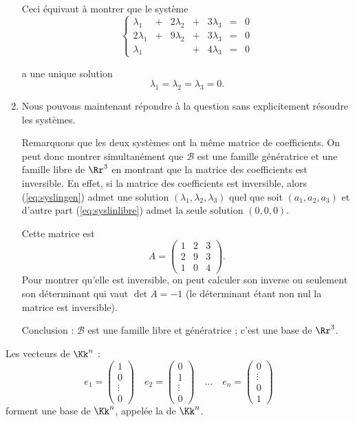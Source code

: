 \documentclass[class=report,crop=false]{standalone}
\begin{document}
\begin{exemple}
\begin{enumerate}
Ceci équivaut à montrer que le  système
\begin{equation}
\left\{
\begin{array}{ccccccc}
\lambda_1 &+ &2\lambda_2 &+ &3\lambda_3 & = & 0\\
2\lambda_1 &+ &9\lambda_2 &+ &3\lambda_3 & = & 0\\
\lambda_1 && &+ &4\lambda_3 & = & 0
\end{array}
\right.
\label{eq:syslinlibre}
\tag{S'}
\end{equation}



a une  unique solution
$$ \lambda_1 = \lambda_2 = \lambda_3 = 0.$$

  \item Nous pouvons maintenant répondre à la question sans explicitement résoudre les systèmes.

  Remarquons que les deux systèmes ont la même matrice de coefficients.
  On peut donc montrer simultanément que $\mathcal{B}$ est une famille génératrice
  et une famille libre de $\Rr^3$ en montrant que la matrice des
  coefficients est inversible.
  En effet, si la matrice des coefficients est inversible, alors (\ref{eq:syslingen})
  admet une solution $(\lambda_1,\lambda_2,\lambda_3)$ quel que soit $(a_1,a_2,a_3)$
  et d'autre part (\ref{eq:syslinlibre})
  admet la seule solution $(0,0,0)$.

  Cette matrice est
$$
A = \begin{pmatrix}
1 & 2 & 3\\
2 & 9 & 3\\
1 &0 & 4\end{pmatrix}.$$
Pour montrer qu'elle est inversible, on peut calculer son inverse
ou seulement son déterminant qui vaut $\det A = -1$
(le déterminant étant non nul la matrice est inversible).

Conclusion : $\mathcal{B}$ est une famille libre et génératrice ; c'est une base de $\Rr^3$.
\end{enumerate}

\end{exemple}



\begin{exemple}\label{ex:basern}
Les vecteurs de $\Kk^n$ :
$$
e_1 = \begin{pmatrix}1\\0\\\vdots\\0\end{pmatrix} \quad
e_2 = \begin{pmatrix}0\\1\\\vdots\\0\end{pmatrix} \quad \ldots  \quad
e_n = \begin{pmatrix}0\\\vdots\\0\\1\end{pmatrix}$$
forment une base de $\Kk^n$, appelée la  de $\Kk^n$.
\end{exemple}
\end{document}
